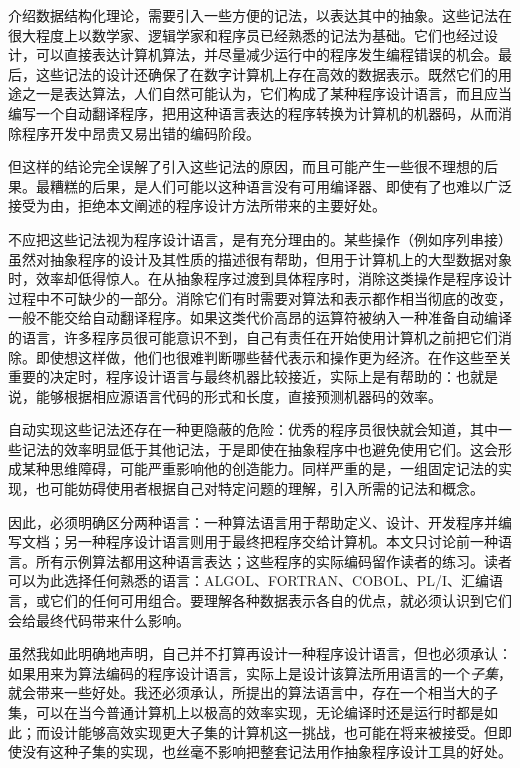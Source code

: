 介绍数据结构化理论，需要引入一些方便的记法，以表达其中的抽象。这些记法在很大程度上以数学家、逻辑学家和程序员已经熟悉的记法为基础。它们也经过设计，可以直接表达计算机算法，并尽量减少运行中的程序发生编程错误的机会。最后，这些记法的设计还确保了在数字计算机上存在高效的数据表示。既然它们的用途之一是表达算法，人们自然可能认为，它们构成了某种程序设计语言，而且应当编写一个自动翻译程序，把用这种语言表达的程序转换为计算机的机器码，从而消除程序开发中昂贵又易出错的编码阶段。

但这样的结论完全误解了引入这些记法的原因，而且可能产生一些很不理想的后果。最糟糕的后果，是人们可能以这种语言没有可用编译器、即使有了也难以广泛接受为由，拒绝本文阐述的程序设计方法所带来的主要好处。

不应把这些记法视为程序设计语言，是有充分理由的。某些操作（例如序列串接）虽然对抽象程序的设计及其性质的描述很有帮助，但用于计算机上的大型数据对象时，效率却低得惊人。在从抽象程序过渡到具体程序时，消除这类操作是程序设计过程中不可缺少的一部分。消除它们有时需要对算法和表示都作相当彻底的改变，一般不能交给自动翻译程序。如果这类代价高昂的运算符被纳入一种准备自动编译的语言，许多程序员很可能意识不到，自己有责任在开始使用计算机之前把它们消除。即使想这样做，他们也很难判断哪些替代表示和操作更为经济。在作这些至关重要的决定时，程序设计语言与最终机器比较接近，实际上是有帮助的：也就是说，能够根据相应源语言代码的形式和长度，直接预测机器码的效率。

自动实现这些记法还存在一种更隐蔽的危险：优秀的程序员很快就会知道，其中一些记法的效率明显低于其他记法，于是即使在抽象程序中也避免使用它们。这会形成某种思维障碍，可能严重影响他的创造能力。同样严重的是，一组固定记法的实现，也可能妨碍使用者根据自己对特定问题的理解，引入所需的记法和概念。

因此，必须明确区分两种语言：一种算法语言用于帮助定义、设计、开发程序并编写文档；另一种程序设计语言则用于最终把程序交给计算机。本文只讨论前一种语言。所有示例算法都用这种语言表达；这些程序的实际编码留作读者的练习。读者可以为此选择任何熟悉的语言：ALGOL、FORTRAN、COBOL、PL/I、汇编语言，或它们的任何可用组合。要理解各种数据表示各自的优点，就必须认识到它们会给最终代码带来什么影响。

虽然我如此明确地声明，自己并不打算再设计一种程序设计语言，但也必须承认：如果用来为算法编码的程序设计语言，实际上是设计该算法所用语言的一个\textit{子集}，就会带来一些好处。我还必须承认，所提出的算法语言中，存在一个相当大的子集，可以在当今普通计算机上以极高的效率实现，无论编译时还是运行时都是如此；而设计能够高效实现更大子集的计算机这一挑战，也可能在将来被接受。但即使没有这种子集的实现，也丝毫不影响把整套记法用作抽象程序设计工具的好处。

